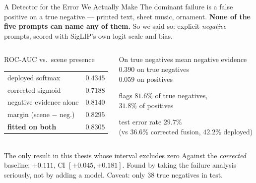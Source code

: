 \documentclass[aspectratio=169,11pt]{beamer}
\begin{document}
\begin{frame}{A Detector for the Error We Actually Make}
\small
The dominant failure is a false positive on a true negative --- printed text, sheet music, ornament. \textbf{None of the five prompts can name any of them.} So we said so: explicit \emph{negative} prompts, scored with SigLIP's own logit scale and bias.
\vspace{1mm}
\begin{columns}[T]
\begin{center}
\scriptsize ROC-AUC vs.\ scene presence
\vspace{1mm}

\begin{tabular}{@{}l c@{}}
\toprule
deployed softmax & $0.4345$ \\
corrected sigmoid & $0.7188$ \\
\midrule
negative evidence alone & $0.8140$ \\
margin (scene $-$ neg.) & $0.8295$ \\
\textbf{fitted on both} & $\mathbf{0.8305}$ \\
\bottomrule
\end{tabular}
\end{center}

\begin{exampleblock}{\small On true negatives}
\scriptsize mean negative evidence \\
\quad $0.390$ on true negatives \\
\quad $0.059$ on positives
\vspace{1mm}

flags $\mathbf{81.6\%}$ of true negatives, \\ $31.8\%$ of positives
\vspace{1mm}

test error rate $\mathbf{29.7\%}$ \\ {\tiny(vs $36.6\%$ corrected fusion, $42.2\%$ deployed)}
\end{exampleblock}
\end{columns}
\vspace{1mm}
\begin{alertblock}{\small The only result in this thesis whose interval excludes zero}
\footnotesize Against the \emph{corrected} baseline: $\mathbf{+0.111}$, CI $[+0.045,+0.181]$. Found by taking the failure analysis seriously, not by adding a model. Caveat: only $38$ true negatives in test.
\end{alertblock}
\end{frame}
\end{document}
